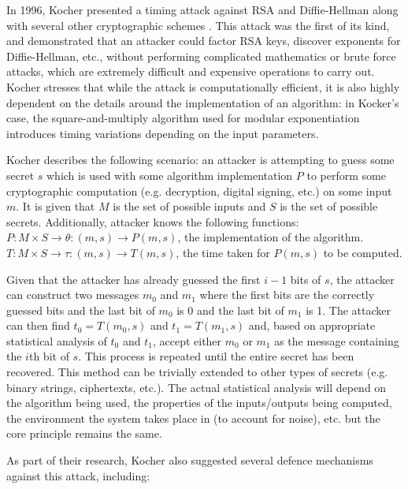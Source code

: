 \documentclass[a4paper,oneside,11pt]{article}
\begin{document}
In 1996, Kocher presented a timing attack against RSA and Diffie-Hellman along
with several other cryptographic schemes \cite{A/Kocher-1996-Timing}. This
attack was the first of its kind, and demonstrated that an attacker could
factor RSA keys, discover exponents for Diffie-Hellman, etc., without
performing complicated mathematics or brute force attacks, which are extremely
difficult and expensive operations to carry out. Kocher stresses that while the
attack is computationally efficient, it is also highly dependent on the details
around the implementation of an algorithm: in Kocker's case, the
square-and-multiply algorithm used for modular exponentiation introduces timing
variations depending on the input parameters.

Kocher describes the following scenario: an attacker is attempting to guess
some secret \( s \) which is used with some algorithm implementation \( P \) to
perform some cryptographic computation (e.g. decryption, digital signing, etc.)
on some input \( m \). It is given that \( M \) is the set of possible inputs
and \( S \) is the set of possible secrets. Additionally, attacker knows the
following functions:\\
\( P: M \times S \to \theta: (m, s) \to P(m, s) \), the implementation of the
algorithm.\\
\( T: M \times S \to \tau: (m, s) \to T(m, s) \), the time taken for \( P(m, s)
\) to be computed.

Given that the attacker has already guessed the first \( i - 1 \) bits of \( s
\), the attacker can construct two messages \( m_0 \) and \( m_1 \) where the
first bits are the correctly guessed bits and the last bit of \( m_0 \) is 0
and the last bit of \( m_1 \) is 1. The attacker can then find \( t_0 = T(m_0,
s) \) and \( t_1 = T(m_1, s) \) and, based on appropriate statistical analysis
of \( t_0 \) and \( t_1 \), accept either \( m_0 \) or \( m_1 \) as the message
containing the \( i \)th bit of \( s \). This process is repeated until the entire
secret has been recovered. This method can be trivially extended to other types
of secrets (e.g. binary strings, ciphertexts, etc.). The actual statistical
analysis will depend on the algorithm being used, the properties of the
inputs/outputs being computed, the environment the system takes place in (to
account for noise), etc. but the core principle remains the same.

As part of their research, Kocher also suggested several defence mechanisms
against this attack, including:
\end{document}
